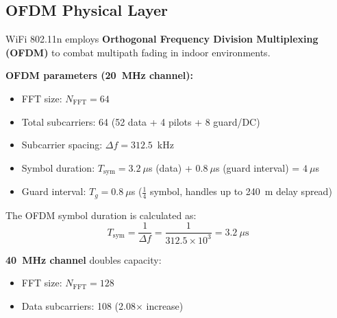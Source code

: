\subsection{OFDM Physical Layer}

WiFi 802.11n employs \textbf{Orthogonal Frequency Division Multiplexing (OFDM)} to combat multipath fading in indoor environments.

\textbf{OFDM parameters (20~MHz channel):}
\begin{itemize}
\item FFT size: $N_{\text{FFT}} = 64$
\item Total subcarriers: 64 (52 data + 4 pilots + 8 guard/DC)
\item Subcarrier spacing: $\Delta f = 312.5$~kHz
\item Symbol duration: $T_{\text{sym}} = 3.2~\mu$s (data) + $0.8~\mu$s (guard interval) = $4~\mu$s
\item Guard interval: $T_g = 0.8~\mu$s ($\frac{1}{4}$ symbol, handles up to 240~m delay spread)
\end{itemize}

The OFDM symbol duration is calculated as:
\begin{equation}
T_{\text{sym}} = \frac{1}{\Delta f} = \frac{1}{312.5 \times 10^3} = 3.2~\mu\text{s}
\end{equation}

\textbf{40~MHz channel} doubles capacity:
\begin{itemize}
\item FFT size: $N_{\text{FFT}} = 128$
\item Data subcarriers: 108 (2.08$\times$ increase)
\end{itemize}


